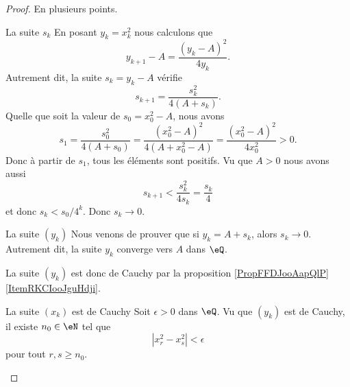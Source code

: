 \begin{proof}
    En plusieurs points.
    \begin{subproof}
        \item[La suite \( s_k\)]
            En posant \( y_k=x_k^2\) nous calculons que
            \begin{equation}
                y_{k+1}-A=\frac{ (y_k-A)^2 }{ 4y_k }.
            \end{equation}
            Autrement dit, la suite \( s_k=y_k-A\) vérifie
            \begin{equation}
                s_{k+1}=\frac{ s_k^2 }{ 4(A+s_k) }.
            \end{equation}
            Quelle que soit la valeur de \( s_0=x_0^2-A\), nous avons
            \begin{equation}
                s_1=\frac{ s_0^2 }{ 4(A+s_0) }=\frac{ (x_0^2-A)^2 }{ 4(A+x_0^2-A) }=\frac{ (x_0^2-A)^2 }{ 4x_0^2 }>0.
            \end{equation}
            Donc à partir de \( s_1\), tous les éléments sont positifs. Vu que \( A>0\) nous avons aussi
            \begin{equation}
                s_{k+1}<\frac{ s_k^2 }{ 4s_k }=\frac{ s_k }{ 4 }
            \end{equation}
            et donc \( s_k<s_0/4^k\). Donc \( s_k\to 0\).
        \item[La suite \( (y_k)\)]
            Nous venons de prouver que si \( y_k=A+s_k\), alors \( s_k\to 0\). Autrement dit, la suite \( y_k\) converge vers \( A\) dans \( \eQ\). 

            La suite \( (y_k)\) est donc de Cauchy par la proposition \ref{PropFFDJooAapQlP}\ref{ItemRKCIooJguHdji}.
        \item[La suite \( (x_k)\) est de Cauchy]
            Soit \( \epsilon>0\) dans \( \eQ\). Vu que \( (y_k)\) est de Cauchy, il existe \( n_0\in \eN\) tel que 
            \begin{equation}
                | x^2_r-x_s^2 |<\epsilon
            \end{equation}
            pour tout \( r,s\geq n_0\).


\end{subproof}
\end{proof}
